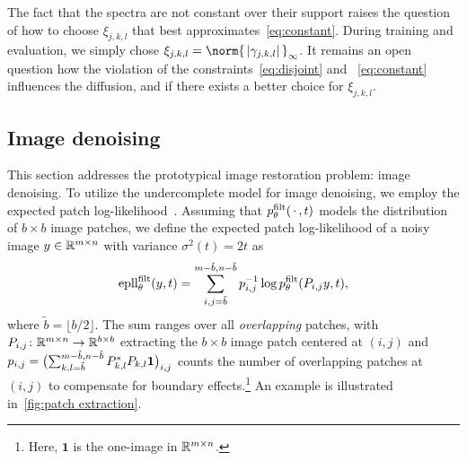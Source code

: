 The fact that the spectra are not constant over their support raises the question of how to choose \( \xi_{j,k,l} \) that best approximates~\eqref{eq:constant}.
During training and evaluation, we simply chose \( \xi_{j,k,l} = \norm{\,|\gamma_{j,k,l}|\,}_\infty \).
It remains an open question how the violation of the constraints~\eqref{eq:disjoint} and ~\eqref{eq:constant} influences the diffusion, and if there exists a better choice for \( \xi_{j,k,l} \).
\subsection{Image denoising}
This section addresses the prototypical image restoration problem: image denoising.
To utilize the undercomplete model for image denoising, we employ the expected patch log-likelihood~\cite{zoran_learning_2011}.
Assuming that \( p^{\mathrm{filt}}_\theta(\,\cdot\,, t) \) models the distribution of \( b \times b \) image patches, we define the expected patch log-likelihood of a noisy image \( y \in \mathbb{R}^{m\times n} \) with variance \( \sigma^{\num{2}}(t) = \num{2}t \) as
\begin{equation}
	\operatorname{epll}_\theta^{\mathrm{filt}}(y, t) = \sum_{i,j=\tilde{b}}^{m-\tilde{b},n - \tilde{b}} p_{i,j}^{-1} \log p^{\mathrm{filt}}_\theta(P_{i, j} y, t),
\end{equation}
where \( \tilde{b} = \lfloor b / \num{2} \rfloor \).
The sum ranges over all \emph{overlapping} patches, with \( P_{i,j} \colon \mathbb{R}^{m\times n} \to \mathbb{R}^{b\times b} \) extracting the \( b \times b \) image patch centered at \( (i, j) \) and \( p_{i, j} = \bigl(\sum_{k,l=\tilde{b}}^{m-\tilde{b}, n-\tilde{b}} P_{k,l}^{\ast} P_{k,l} \mathbf{1} \bigr)_{i, j} \) counts the number of overlapping patches at \( (i, j) \) to compensate for boundary effects.\footnote{%
	Here, \( \mathbf{1} \) is the one-image in \( \mathbb{R}^{m\times n} \).
}
An example is illustrated in~\cref{fig:patch extraction}.
